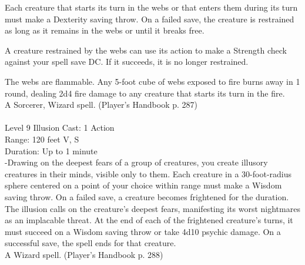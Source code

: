 \documentclass[10pt,twocolumn]{report}
\begin{document}
Each creature that starts its turn in the webs or that enters them during its turn must make a Dexterity saving throw. On a failed save, the creature is restrained as long as it remains in the webs or until it breaks free.

A creature restrained by the webs can use its action to make a Strength check against your spell save DC. If it succeeds, it is no longer restrained.

The webs are flammable. Any 5-foot cube of webs exposed to fire burns away in 1 round, dealing 2d4 fire damage to any creature that starts its turn in the fire.\\
A Sorcerer, Wizard spell. (Player's Handbook p. 287) \\


 \\
Level 9 \quad Illusion \quad Cast: 1 Action\\
Range: 120 feet \quad V, S\\
Duration: Up to 1 minute \quad \\
-Drawing on the deepest fears of a group of creatures, you create illusory creatures in their minds, visible only to them.
Each creature in a 30-foot-radius sphere centered on a point of your choice within range must make a Wisdom saving throw. On a failed save, a creature becomes frightened for the duration.
The illusion calls on the creature’s deepest fears, manifesting its worst nightmares as an implacable threat. At the end of each of the frightened creature’s turns, it must succeed on a Wisdom saving throw or take 4d10 psychic damage. On a successful save, the spell ends for that creature.\\
A Wizard spell. (Player's Handbook p. 288) \\
\end{document}
